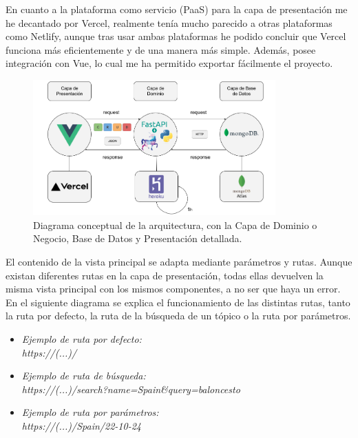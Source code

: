 \vspace{0.3cm}

En cuanto a la plataforma como servicio (\ac{PaaS}) para la capa de presentación me he decantado por Vercel, realmente tenía mucho parecido a otras plataformas como Netlify, aunque tras usar ambas plataformas he podido concluir que Vercel funciona más eficientemente y de una manera más simple. Además, posee integración con Vue, lo cual me ha permitido exportar fácilmente el proyecto.

\begin{figure}[H]
    \centering
    \myfloatalign
    \includegraphics[width=0.83\textwidth]{gfx/DiagramaRutas3.png}
    \caption[Diagrama conceptual con más detalle (3)]{Diagrama conceptual de la arquitectura, con la Capa de Dominio o Negocio, Base de Datos y Presentación detallada.}\label{gfx:DiagramaRutas3}
\end{figure}

El contenido de la vista principal se adapta mediante parámetros y rutas. Aunque existan diferentes rutas en la capa de presentación, todas ellas devuelven la misma vista principal con los mismos componentes, a no ser que haya un error. En el siguiente diagrama se explica el funcionamiento de las distintas rutas, tanto la ruta por defecto, la ruta de la búsqueda de un tópico o la ruta por parámetros.

\begin{itemize}
    \item
    \textit{Ejemplo de ruta por defecto: \\
    https://(...)/}
    \item
    \textit{Ejemplo de ruta de búsqueda: \\
    https://(...)/search?name=Spain\&query=baloncesto}
    \item
    \textit{Ejemplo de ruta por parámetros: \\
    https://(...)/Spain/22-10-24}
\end{itemize}

